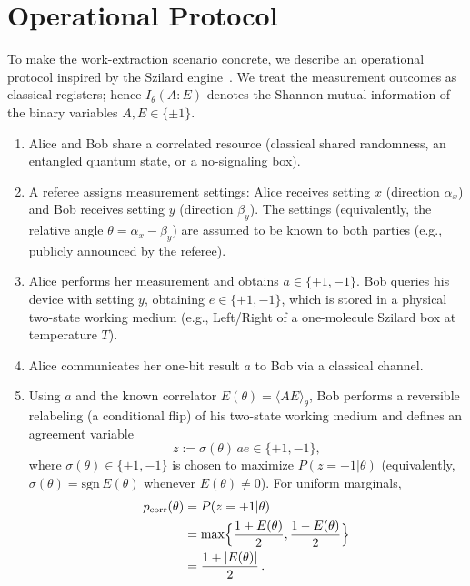 \documentclass[pra,twocolumn,showpacs,preprintnumbers,amsmath,amssymb,longbibliography,
               superscriptaddress]{revtex4-2}
\begin{document}
\section{{Operational Protocol}}
\label{sec:protocol}

{To make the work-extraction scenario concrete, we describe an
operational protocol inspired by the Szilard
engine~\cite{Szilard-1929,SagawaUeda2008}.
We treat the measurement outcomes as classical registers; hence
$I_\theta(A{:}E)$ denotes the Shannon mutual information of the binary
variables $A,E\in\{\pm1\}$.}

\begin{enumerate}
\item {Alice and Bob share a correlated resource (classical shared
randomness, an entangled quantum state, or a no-signaling box).}

\item {A referee assigns measurement settings: Alice receives setting $x$
(direction $\alpha_x$) and Bob receives setting $y$ (direction $\beta_y$).
The settings (equivalently, the relative angle
$\theta=\alpha_x-\beta_y$) are assumed to be known to both parties
(e.g., publicly announced by the referee).}

\item {Alice performs her measurement and obtains $a\in\{+1,-1\}$.
Bob queries his device with setting $y$, obtaining $e\in\{+1,-1\}$,
which is stored in a physical two-state working medium
(e.g., Left/Right of a one-molecule Szilard box at temperature $T$).}

\item {Alice communicates her one-bit result $a$ to Bob via a classical
channel.}

\item {Using $a$ and the known correlator $E(\theta)=\langle AE\rangle_\theta$,
Bob performs a reversible relabeling (a conditional flip) of his
two-state working medium and defines an agreement variable
\[
z := \sigma(\theta)\, a e \in \{+1,-1\},
\]
where $\sigma(\theta)\in\{+1,-1\}$ is chosen to maximize
$P(z=+1|\theta)$
(equivalently, $\sigma(\theta)=\mathrm{sgn}\,E(\theta)$ whenever
$E(\theta)\neq 0$).
For uniform marginals,
\begin{equation}
\begin{split}
p_{\rm corr}(\theta) &= P(z=+1|\theta)  \\
&= \max\!\Big\{\frac{1+E(\theta)}{2},\frac{1-E(\theta)}{2}\Big\} \\
&= \frac{1+|E(\theta)|}{2}\,.
\end{split}
\label{eq:pcorr}
\end{equation}}


\end{enumerate}
\end{document}
